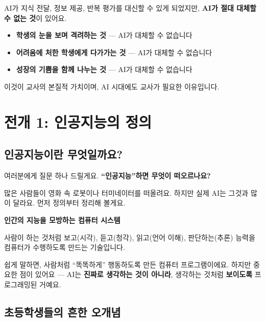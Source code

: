 \documentclass[11pt,a4paper]{article}
\begin{document}
AI가 지식 전달, 정보 제공, 반복 평가를 대신할 수 있게 되었지만, \textbf{AI가 절대 대체할 수 없는 것}이 있어요.

\begin{itemize}[leftmargin=2em]
\item {} \textbf{학생의 눈을 보며 격려하는 것} — AI가 대체할 수 없습니다
\item {} \textbf{어려움에 처한 학생에게 다가가는 것} — AI가 대체할 수 없습니다
\item {} \textbf{성장의 기쁨을 함께 나누는 것} — AI가 대체할 수 없습니다
\end{itemize}

이것이 교사의 본질적 가치이며, AI 시대에도 교사가 필요한 이유입니다.

\section{ 전개 1: 인공지능의 정의}

\subsection{인공지능이란 무엇일까요?}

여러분에게 질문 하나 드릴게요. \textbf{``인공지능''하면 무엇이 떠오르나요?}

많은 사람들이 영화 속 로봇이나 터미네이터를 떠올려요. 하지만 실제 AI는 그것과 많이 달라요. 먼저 정의부터 정리해 볼게요.

\begin{definitionbox}
\textbf{인간의 지능을 모방하는 컴퓨터 시스템}

사람이 하는 것처럼 보고(시각), 듣고(청각), 읽고(언어 이해), 판단하는(추론) 능력을 컴퓨터가 수행하도록 만드는 기술입니다.
\end{definitionbox}

쉽게 말하면, 사람처럼 ``똑똑하게'' 행동하도록 만든 컴퓨터 프로그램이에요. 하지만 중요한 점이 있어요 — AI는 \textbf{진짜로 생각하는 것이 아니라}, 생각하는 것처럼 \textbf{보이도록} 프로그래밍된 거예요.

\subsection{초등학생들의 흔한 오개념}
\end{document}
